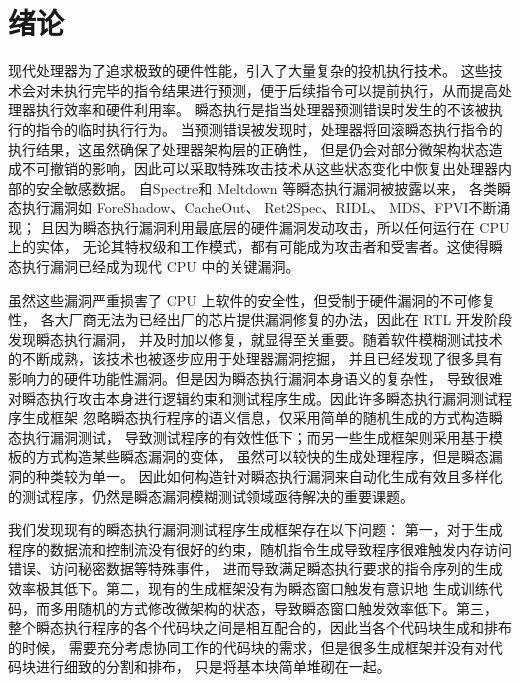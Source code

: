 \cleardoublepage

\section{绪论}

现代处理器为了追求极致的硬件性能，引入了大量复杂的投机执行技术\cite{gonzalez2010processor}。
这些技术会对未执行完毕的指令结果进行预测，便于后续指令可以提前执行，从而提高处理器执行效率和硬件利用率。
瞬态执行是指当处理器预测错误时发生的不该被执行的指令的临时执行行为。
当预测错误被发现时，处理器将回滚瞬态执行指令的执行结果，这虽然确保了处理器架构层的正确性，
但是仍会对部分微架构状态造成不可撤销的影响，因此可以采取特殊攻击技术从这些状态变化中恢复出处理器内部的安全敏感数据。
自Spectre\cite{kocher2020spectre}和 Meltdown\cite{horn2018meltdown} 等瞬态执行漏洞被披露以来，
各类瞬态执行漏洞如 ForeShadow\cite{van2018foreshadow}、CacheOut\cite{van2021cacheout}、
Ret2Spec\cite{maisuradze2018ret2spec}、RIDL\cite{mathure2023hardware}、
MDS\cite{minkin2019fallout}、FPVI\cite{ragab2021rage}不断涌现；
且因为瞬态执行漏洞利用最底层的硬件漏洞发动攻击，所以任何运行在 CPU 上的实体，
无论其特权级和工作模式，都有可能成为攻击者和受害者。这使得瞬态执行漏洞已经成为现代 CPU 中的关键漏洞。\par

虽然这些漏洞严重损害了 CPU 上软件的安全性，但受制于硬件漏洞的不可修复性，
各大厂商无法为已经出厂的芯片提供漏洞修复的办法，因此在 RTL 开发阶段发现瞬态执行漏洞，
并及时加以修复，就显得至关重要。随着软件模糊测试技术的不断成熟，该技术也被逐步应用于处理器漏洞挖掘，
并且已经发现了很多具有影响力的硬件功能性漏洞。但是因为瞬态执行漏洞本身语义的复杂性，
导致很难对瞬态执行攻击本身进行逻辑约束和测试程序生成。因此许多瞬态执行漏洞测试程序生成框架
忽略瞬态执行程序的语义信息，仅采用简单的随机生成的方式构造瞬态执行漏洞测试，
导致测试程序的有效性低下；而另一些生成框架则采用基于模板的方式构造某些瞬态漏洞的变体，
虽然可以较快的生成处理程序，但是瞬态漏洞的种类较为单一。
因此如何构造针对瞬态执行漏洞来自动化生成有效且多样化的测试程序，仍然是瞬态漏洞模糊测试领域亟待解决的重要课题。\par

我们发现现有的瞬态执行漏洞测试程序生成框架存在以下问题：
第一，对于生成程序的数据流和控制流没有很好的约束，随机指令生成导致程序很难触发内存访问错误、访问秘密数据等特殊事件，
进而导致满足瞬态执行要求的指令序列的生成效率极其低下。第二，现有的生成框架没有为瞬态窗口触发有意识地
生成训练代码，而多用随机的方式修改微架构的状态，导致瞬态窗口触发效率低下。第三，
整个瞬态执行程序的各个代码块之间是相互配合的，因此当各个代码块生成和排布的时候，
需要充分考虑协同工作的代码块的需求，但是很多生成框架并没有对代码块进行细致的分割和排布，
只是将基本块简单堆砌在一起。\par

